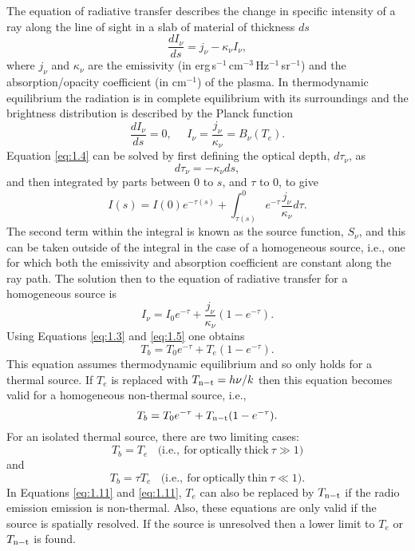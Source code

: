 The equation of radiative transfer describes the change in specific intensity of a ray along the line of sight in a slab of material of thickness $ds$
\begin{equation}\label{eq:1.4}
\frac{dI_{\nu}}{ds}=j_{\nu} - \kappa _{\nu}I_{\nu},
\end{equation}
where $j_{\nu}$ and $\kappa _{\nu}$ are the emissivity (in erg\,s$^{-1}$\,cm$^{-3}$\,Hz$^{-1}$\,sr$^{-1}$) and the absorption/opacity coefficient (in cm$^{-1}$) of the plasma. In thermodynamic equilibrium the radiation is in complete equilibrium with its surroundings and the brightness distribution is described by the Planck function
\begin{equation}\label{eq:1.5}
\dfrac{dI_{\nu}}{ds}=0, \ \ \ \ \ \ I_{\nu}= \frac{j_{\nu}}{\kappa _{\nu}}=B_{\nu}(T_e).
\end{equation}
Equation \ref{eq:1.4} can be solved by first defining the optical depth, $d\tau _{\nu}$, as
\begin{equation}
d\tau _{\nu}=-\kappa _{\nu}ds,
\end{equation}
and then integrated by parts between 0 to $s$, and $\tau$ to 0, to give 
\begin{equation}
I(s) = I(0)e^{-\tau(s)} + \int ^0 _{\tau (s)}e^{-\tau} \frac{j_{\nu}}{\kappa _{\nu}}d\tau.
\end{equation}
The second term within the integral is known as the source function, $S_{\nu}$, and this can be taken outside of the integral in the case of a homogeneous source, i.e., one for which both the emissivity and absorption coefficient are constant along the ray path. The solution then to the equation of radiative transfer for a homogeneous source is
\begin{equation}\label{eq:1.9}
I_{\nu} = I_{0}e^{-\tau} + \frac{j_{\nu}}{\kappa _{\nu}}(1 - e^{-\tau}).
\end{equation}
Using Equations \ref{eq:1.3} and \ref{eq:1.5} one obtains
\begin{equation}
T_{b} = T_{0}e^{-\tau} + T_{e}(1 - e^{-\tau}).
\end{equation}
This equation assumes thermodynamic equilibrium and so only holds for a thermal source. If $T_{e}$ is replaced with $T_{\rm{n-t}} = h\nu/k$  then this equation becomes valid for a homogeneous non-thermal source, i.e.,
\begin{equation}
T_{b} = T_{0}e^{-\tau} + T_{\rm{n-t}}(1 - e^{-\tau}).
\end{equation}
For an isolated thermal source, there are two limiting cases:
\begin{equation}\label{eq:1.11}
T_{b} = T_{e} \ \ \ \ \mathrm{(i.e.,\ for\ optically\ thick}\ \tau \gg 1)
\end{equation}
and
\begin{equation}\label{eq:1.12}
T_{b} = \tau T_{e} \ \ \ \ \mathrm{(i.e.,\ for\ optically\ thin}\ \tau \ll 1).
\end{equation}
In Equations \ref{eq:1.11} and \ref{eq:1.11}, $T_{e}$ can also be replaced by $T_{\rm{n-t}}$ if the radio emission emission is non-thermal. Also, these equations are only valid if the source is spatially resolved. If the source is unresolved then a lower limit to $T_{e}$ or $T_{\rm{n-t}}$ is found.

